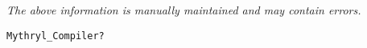 \label{pkg:mythryl\_compiler}

{\tiny \it The above information is manually maintained and may contain errors.}
\begin{verbatim}
Mythryl_Compiler?
\end{verbatim}
